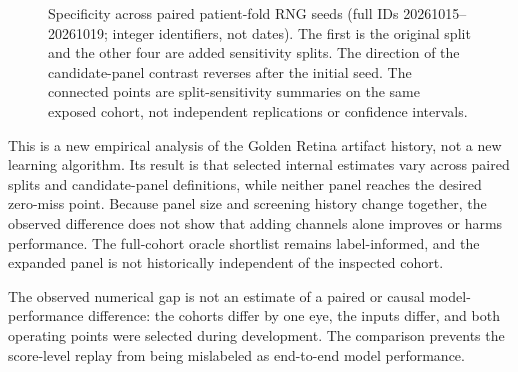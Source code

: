 \documentclass[11pt]{article}
\begin{document}
\begin{figure}[t]
\centering
{}
\caption{Specificity across paired patient-fold RNG seeds (full IDs 20261015--20261019; integer identifiers, not dates). The first is the original split and the other four are added sensitivity splits. The direction of the candidate-panel contrast reverses after the initial seed. The connected points are split-sensitivity summaries on the same exposed cohort, not independent replications or confidence intervals.}
\label{fig:panel-seed-sensitivity}
\end{figure}

This is a new empirical analysis of the Golden Retina artifact history, not a new learning algorithm. Its result is that selected internal estimates vary across paired splits and candidate-panel definitions, while neither panel reaches the desired zero-miss point. Because panel size and screening history change together, the observed difference does not show that adding channels alone improves or harms performance. The full-cohort oracle shortlist remains label-informed, and the expanded panel is not historically independent of the inspected cohort.

The observed numerical gap is not an estimate of a paired or causal model-performance difference: the cohorts differ by one eye, the inputs differ, and both operating points were selected during development. The comparison prevents the score-level replay from being mislabeled as end-to-end model performance.
\end{document}

